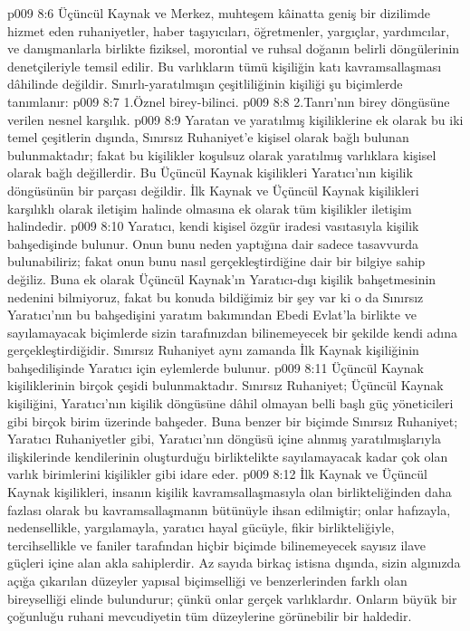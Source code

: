 \vs p009 8:6 Üçüncül Kaynak ve Merkez, muhteşem kâinatta geniş bir dizilimde hizmet eden ruhaniyetler, haber taşıyıcıları, öğretmenler, yargıçlar, yardımcılar, ve danışmanlarla birlikte fiziksel, morontial ve ruhsal doğanın belirli döngülerinin denetçileriyle temsil edilir. Bu varlıkların tümü kişiliğin katı kavramsallaşması dâhilinde değildir. Sınırlı\hyp{}yaratılmışın çeşitliliğinin kişiliği şu biçimlerde tanımlanır:
\vs p009 8:7 1.\bibnobreakspace Öznel birey\hyp{}bilinci.
\vs p009 8:8 2.\bibnobreakspace Tanrı’nın birey döngüsüne verilen nesnel karşılık.
\vs p009 8:9 Yaratan ve yaratılmış kişiliklerine ek olarak bu iki temel çeşitlerin dışında, Sınırsız Ruhaniyet’e kişisel olarak bağlı bulunan bulunmaktadır; fakat bu kişilikler koşulsuz olarak yaratılmış varlıklara kişisel olarak bağlı değillerdir. Bu Üçüncül Kaynak kişilikleri Yaratıcı’nın kişilik döngüsünün bir parçası değildir. İlk Kaynak ve Üçüncül Kaynak kişilikleri karşılıklı olarak iletişim halinde olmasına ek olarak tüm kişilikler iletişim halindedir.
\vs p009 8:10 Yaratıcı, kendi kişisel özgür iradesi vasıtasıyla kişilik bahşedişinde bulunur. Onun bunu neden yaptığına dair sadece tasavvurda bulunabiliriz; fakat onun bunu nasıl gerçekleştirdiğine dair bir bilgiye sahip değiliz. Buna ek olarak Üçüncül Kaynak’ın Yaratıcı\hyp{}dışı kişilik bahşetmesinin nedenini bilmiyoruz, fakat bu konuda bildiğimiz bir şey var ki o da Sınırsız Yaratıcı’nın bu bahşedişini yaratım bakımından Ebedi Evlat’la birlikte ve sayılamayacak biçimlerde sizin tarafınızdan bilinemeyecek bir şekilde kendi adına gerçekleştirdiğidir. Sınırsız Ruhaniyet aynı zamanda İlk Kaynak kişiliğinin bahşedilişinde Yaratıcı için eylemlerde bulunur.
\vs p009 8:11 Üçüncül Kaynak kişiliklerinin birçok çeşidi bulunmaktadır. Sınırsız Ruhaniyet; Üçüncül Kaynak kişiliğini, Yaratıcı’nın kişilik döngüsüne dâhil olmayan belli başlı güç yöneticileri gibi birçok birim üzerinde bahşeder. Buna benzer bir biçimde Sınırsız Ruhaniyet; Yaratıcı Ruhaniyetler gibi, Yaratıcı’nın döngüsü içine alınmış yaratılmışlarıyla ilişkilerinde kendilerinin oluşturduğu birliktelikte sayılamayacak kadar çok olan varlık birimlerini kişilikler gibi idare eder.
\vs p009 8:12 İlk Kaynak ve Üçüncül Kaynak kişilikleri, insanın kişilik kavramsallaşmasıyla olan birlikteliğinden daha fazlası olarak bu kavramsallaşmanın bütünüyle ihsan edilmiştir; onlar hafızayla, nedensellikle, yargılamayla, yaratıcı hayal gücüyle, fikir birlikteliğiyle, tercihsellikle ve faniler tarafından hiçbir biçimde bilinemeyecek sayısız ilave güçleri içine alan akla sahiplerdir. Az sayıda birkaç istisna dışında, sizin algınızda açığa çıkarılan düzeyler yapısal biçimselliği ve benzerlerinden farklı olan bireyselliği elinde bulundurur; çünkü onlar gerçek varlıklardır. Onların büyük bir çoğunluğu ruhani mevcudiyetin tüm düzeylerine görünebilir bir haldedir.

